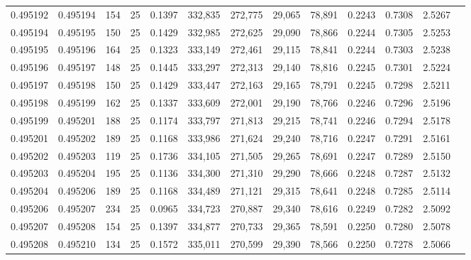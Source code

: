 \begin{tabular}{rrrrrrrrrrrrr}
0.495192 & 0.495194 &   154 &  25 &                                     0.1397 & 332,835 & 272,775 &  29,065 &  78,891 & 0.2243 & 0.7308 & 2.5267 \\
0.495194 & 0.495195 &   150 &  25 &                                     0.1429 & 332,985 & 272,625 &  29,090 &  78,866 & 0.2244 & 0.7305 & 2.5253 \\
0.495195 & 0.495196 &   164 &  25 &                                     0.1323 & 333,149 & 272,461 &  29,115 &  78,841 & 0.2244 & 0.7303 & 2.5238 \\
0.495196 & 0.495197 &   148 &  25 &                                     0.1445 & 333,297 & 272,313 &  29,140 &  78,816 & 0.2245 & 0.7301 & 2.5224 \\
0.495197 & 0.495198 &   150 &  25 &                                     0.1429 & 333,447 & 272,163 &  29,165 &  78,791 & 0.2245 & 0.7298 & 2.5211 \\
0.495198 & 0.495199 &   162 &  25 &                                     0.1337 & 333,609 & 272,001 &  29,190 &  78,766 & 0.2246 & 0.7296 & 2.5196 \\
0.495199 & 0.495201 &   188 &  25 &                                     0.1174 & 333,797 & 271,813 &  29,215 &  78,741 & 0.2246 & 0.7294 & 2.5178 \\
0.495201 & 0.495202 &   189 &  25 &                                     0.1168 & 333,986 & 271,624 &  29,240 &  78,716 & 0.2247 & 0.7291 & 2.5161 \\
0.495202 & 0.495203 &   119 &  25 &                                     0.1736 & 334,105 & 271,505 &  29,265 &  78,691 & 0.2247 & 0.7289 & 2.5150 \\
0.495203 & 0.495204 &   195 &  25 &                                     0.1136 & 334,300 & 271,310 &  29,290 &  78,666 & 0.2248 & 0.7287 & 2.5132 \\
0.495204 & 0.495206 &   189 &  25 &                                     0.1168 & 334,489 & 271,121 &  29,315 &  78,641 & 0.2248 & 0.7285 & 2.5114 \\
0.495206 & 0.495207 &   234 &  25 &                                     0.0965 & 334,723 & 270,887 &  29,340 &  78,616 & 0.2249 & 0.7282 & 2.5092 \\
0.495207 & 0.495208 &   154 &  25 &                                     0.1397 & 334,877 & 270,733 &  29,365 &  78,591 & 0.2250 & 0.7280 & 2.5078 \\
0.495208 & 0.495210 &   134 &  25 &                                     0.1572 & 335,011 & 270,599 &  29,390 &  78,566 & 0.2250 & 0.7278 & 2.5066 \\

\end{tabular}
